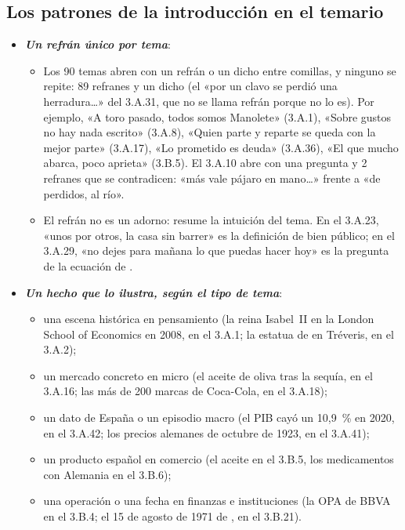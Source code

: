 \documentclass[11pt]{article}
\begin{document}
\subsection{Los patrones de la introducción en el temario}\label{sec:patrones-intro}

\begin{itemize}
\item \textbf{\emph{Un refrán único por tema}}:
  \begin{itemize}
  \item Los 90 temas abren con un refrán o un dicho entre comillas, y ninguno se repite: 89 refranes y un dicho (el «por un clavo se perdió una herradura…» del 3.A.31, que no se llama refrán porque no lo es). Por ejemplo, «A toro pasado, todos somos Manolete» (3.A.1), «Sobre gustos no hay nada escrito» (3.A.8), «Quien parte y reparte se queda con la mejor parte» (3.A.17), «Lo prometido es deuda» (3.A.36), «El que mucho abarca, poco aprieta» (3.B.5). El 3.A.10 abre con una pregunta y 2 refranes que se contradicen: «más vale pájaro en mano…» frente a «de perdidos, al río».
  \item El refrán no es un adorno: resume la intuición del tema. En el 3.A.23, «unos por otros, la casa sin barrer» es la definición de bien público; en el 3.A.29, «no dejes para mañana lo que puedas hacer hoy» es la pregunta de la ecuación de .
  \end{itemize}
\item \textbf{\emph{Un hecho que lo ilustra, según el tipo de tema}}:
  \begin{itemize}
  \item una escena histórica en pensamiento (la reina Isabel~II en la London School of Economics en 2008, en el 3.A.1; la estatua de  en Tréveris, en el 3.A.2);
  \item un mercado concreto en micro (el aceite de oliva tras la sequía, en el 3.A.16; las más de 200 marcas de Coca-Cola, en el 3.A.18);
  \item un dato de España o un episodio macro (el PIB cayó un 10,9~\% en 2020, en el 3.A.42; los precios alemanes de octubre de 1923, en el 3.A.41);
  \item un producto español en comercio (el aceite en el 3.B.5, los medicamentos con Alemania en el 3.B.6);
  \item una operación o una fecha en finanzas e instituciones (la OPA de BBVA en el 3.B.4; el 15 de agosto de 1971 de , en el 3.B.21).
  \end{itemize}

\end{itemize}
\end{document}

